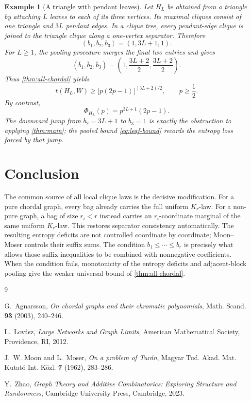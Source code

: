 \documentclass[11pt]{article}
\newtheorem{example}[example]{Example}
\numberwithin{equation}{section}
\begin{document}
\begin{example}[A triangle with pendant leaves]\label{ex:leaves}
Let $H_L$ be obtained from a triangle by attaching $L$ leaves to each of
its three vertices.  Its maximal cliques consist of one triangle and
$3L$ pendant edges.  In a clique tree, every pendant-edge clique is
joined to the triangle clique along a one-vertex separator.  Therefore
\[
 (b_1,b_2,b_3)=(1,3L+1,1).
\]
For $L\geq1$, the pooling procedure merges the final two entries and gives
\[
 (\bar b_1,\bar b_2,\bar b_3)
 =
 \left(1,\frac{3L+2}{2},\frac{3L+2}{2}\right).
\]
Thus \cref{thm:all-chordal} yields
\begin{equation}
 t(H_L,W)
 \geq
 \bigl[p(2p-1)\bigr]^{(3L+2)/2},
 \qquad p\geq\frac12.\label{eq:leaf-bound}
\end{equation}
By contrast,
\[
 \Phi_{H_L}(p)=p^{3L+1}(2p-1).
\]
The downward jump from $b_2=3L+1$ to $b_3=1$ is exactly the obstruction
to applying \cref{thm:main}; the pooled bound
\eqref{eq:leaf-bound} records the entropy loss forced by that jump.
\end{example}

\section{Conclusion}

The common source of all local clique laws is the decisive modification.
For a pure chordal graph, every bag already carries the full uniform
$K_r$-law.  For a non-pure graph, a bag of size $r_i<r$ instead carries
an $r_i$-coordinate marginal of the same uniform $K_r$-law.  This restores
separator consistency automatically.  The resulting entropy deficits
are not controlled coordinate by coordinate; Moon--Moser controls their
suffix sums.  The condition $b_1\leq\cdots\leq b_r$ is precisely what
allows those suffix inequalities to be combined with nonnegative
coefficients.  When the condition fails, monotonicity of the entropy
deficits and adjacent-block pooling give the weaker universal bound of
\cref{thm:all-chordal}.

\begin{thebibliography}{9}

G.~Agnarsson,
\emph{On chordal graphs and their chromatic polynomials},
Math. Scand. \textbf{93} (2003), 240--246.

L.~Lov\'asz,
\emph{Large Networks and Graph Limits},
American Mathematical Society, Providence, RI, 2012.

J.~W. Moon and L.~Moser,
\emph{On a problem of Tur\'an},
Magyar Tud. Akad. Mat. Kutat\'o Int. K\"ozl. \textbf{7} (1962), 283--286.

Y.~Zhao,
\emph{Graph Theory and Additive Combinatorics: Exploring Structure and Randomness},
Cambridge University Press, Cambridge, 2023.

\end{thebibliography}
\end{document}
